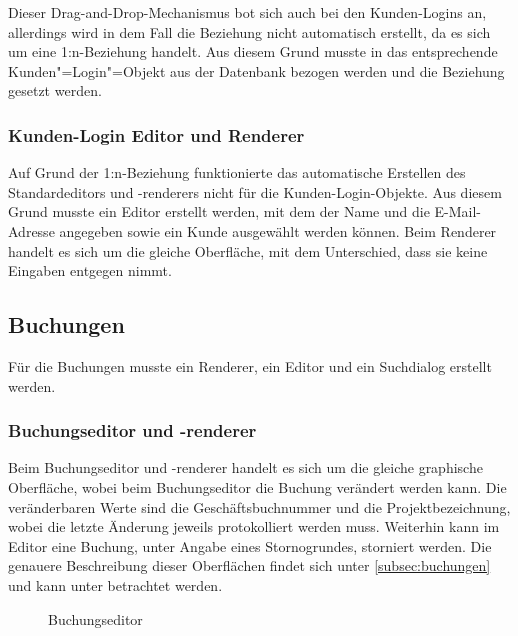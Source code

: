 Dieser Drag-and-Drop-Mechanismus bot sich auch bei den Kunden-Logins an, allerdings wird in dem Fall die Beziehung nicht automatisch erstellt, da es sich um eine 1:n-Beziehung handelt.
Aus diesem Grund musste in das entsprechende Kunden"=Login"=Objekt aus der Datenbank bezogen werden und die Beziehung gesetzt werden.


\subsubsection{Kunden-Login Editor und Renderer}
Auf Grund der 1:n-Beziehung funktionierte das automatische Erstellen des Standardeditors und -renderers nicht für die Kunden-Login-Objekte.
Aus diesem Grund musste ein Editor erstellt werden, mit dem der Name und die E-Mail-Adresse angegeben sowie ein Kunde ausgewählt werden können. Beim Renderer handelt es sich um die gleiche Oberfläche, mit dem Unterschied, dass sie keine Eingaben entgegen nimmt. 

\subsection{Buchungen}
Für die Buchungen musste ein Renderer, ein Editor und ein Suchdialog erstellt werden.

\subsubsection{Buchungseditor und -renderer}
Beim Buchungseditor und -renderer handelt es sich um die gleiche graphische Oberfläche, wobei beim Buchungseditor die Buchung verändert werden kann.
Die veränderbaren Werte sind die Geschäftsbuchnummer und die Projektbezeichnung, wobei die letzte Änderung jeweils protokolliert werden muss.
Weiterhin kann im Editor eine Buchung, unter Angabe eines Stornogrundes, storniert werden.
Die genauere Beschreibung dieser Oberflächen findet sich unter \autoref{subsec:buchungen} und kann unter  betrachtet werden.

\begin{figure}[htbp]
	\centering
	\caption{Buchungseditor}
	\label{fig:buchungseditor}
\end{figure}

